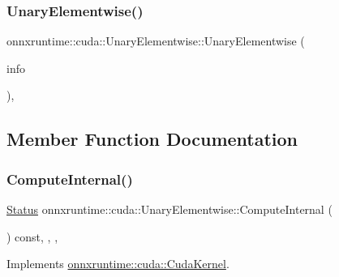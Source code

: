 \subsubsection{\texorpdfstring{Unary\+Elementwise()}{UnaryElementwise()}}
{\footnotesize\ttfamily onnxruntime\+::cuda\+::\+Unary\+Elementwise\+::\+Unary\+Elementwise (\begin{DoxyParamCaption}\item[{const \mbox{\hyperlink{classonnxruntime_1_1OpKernelInfo}{Op\+Kernel\+Info}} \&}]{info }\end{DoxyParamCaption})\hspace{0.3cm}{\ttfamily [inline]}, {\ttfamily [protected]}}



\subsection{Member Function Documentation}
\mbox{\label{classonnxruntime_1_1cuda_1_1UnaryElementwise_abbbcb29c3937e2ac9e2ad768d9c69fca}} 
\subsubsection{\texorpdfstring{Compute\+Internal()}{ComputeInternal()}}
{\footnotesize\ttfamily \mbox{\hyperlink{classonnxruntime_1_1common_1_1Status}{Status}} onnxruntime\+::cuda\+::\+Unary\+Elementwise\+::\+Compute\+Internal (\begin{DoxyParamCaption}\item[{\mbox{\hyperlink{classonnxruntime_1_1OpKernelContext}{Op\+Kernel\+Context}} $\ast$}]{ }\end{DoxyParamCaption}) const\hspace{0.3cm}{\ttfamily [inline]}, {\ttfamily [override]}, {\ttfamily [protected]}, {\ttfamily [virtual]}}



Implements \mbox{\hyperlink{classonnxruntime_1_1cuda_1_1CudaKernel_aca7af04ae448017d6023d30bba231ebb}{onnxruntime\+::cuda\+::\+Cuda\+Kernel}}.



